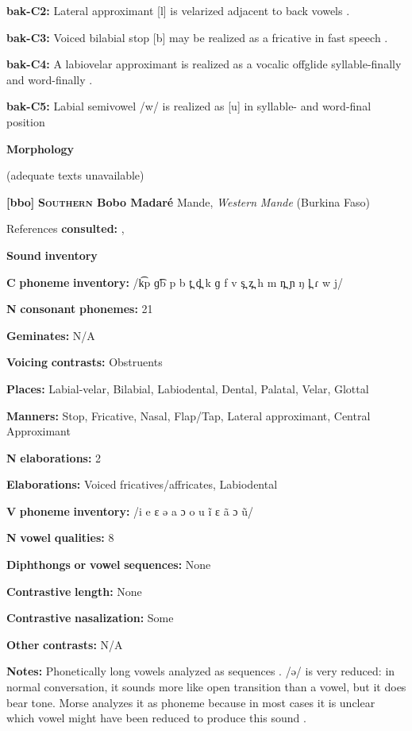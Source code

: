 \begin{styleBody}
\textbf{bak-C2:} Lateral approximant [l] is velarized adjacent to back vowels \citep[10]{Poppe1964}.

\textbf{bak-C3:} Voiced bilabial stop [b] may be realized as a fricative in fast speech \citep[8]{Poppe1964}.

\textbf{bak-C4:}  A labiovelar approximant is realized as a vocalic offglide syllable-finally and word-finally \citep[9]{Poppe1964}.

\textbf{bak-C5:} Labial semivowel /w/ is realized as [u] in syllable- and word-final position \citep[9]{Poppe1964}

\textbf{Morphology}

(adequate texts unavailable)

\textbf{[bbo]}   \textbf{\textsc{Southern} \textbf{Bobo} \textbf{Madaré}}  Mande, \textit{Western} \textit{Mande} (Burkina Faso)

References \textbf{consulted:} \citet{Morse1976}, \citet{Sanou1978}

\textbf{Sound} \textbf{inventory}

\textbf{C} \textbf{phoneme} \textbf{inventory:} /k͡p ɡ͡b p b t̪ d̪ k ɡ f v s̪ z̪ h m n̪ ɲ ŋ l̪ ɾ w j/

\textbf{N} \textbf{consonant} \textbf{phonemes:} 21

\textbf{Geminates:} N/A

\textbf{Voicing} \textbf{contrasts:} Obstruents

\textbf{Places:} Labial-velar, Bilabial, Labiodental, Dental, Palatal, Velar, Glottal

\textbf{Manners:} Stop, Fricative, Nasal, Flap/Tap, Lateral approximant, Central Approximant

\textbf{N} \textbf{elaborations:} 2

\textbf{Elaborations:} Voiced fricatives/affricates, Labiodental

\textbf{V} \textbf{phoneme} \textbf{inventory:} /i e ɛ ə a ɔ o u ĩ ɛ ã ɔ ũ/

\textbf{N} \textbf{vowel} \textbf{qualities:} 8

\textbf{Diphthongs} \textbf{or} \textbf{vowel} \textbf{sequences:} None

\textbf{Contrastive} \textbf{length:} None

\textbf{Contrastive} \textbf{nasalization:} Some

\textbf{Other} \textbf{contrasts:} N/A

\textbf{Notes:} Phonetically long vowels analyzed as sequences \citep[100-105]{Morse1976}. /ə/ is very reduced: in normal conversation, it sounds more like open transition than a vowel, but it does bear tone. Morse analyzes it as phoneme because in most cases it is unclear which vowel might have been reduced to produce this sound \citep[42-5]{Morse1976}.


\end{styleBody}
